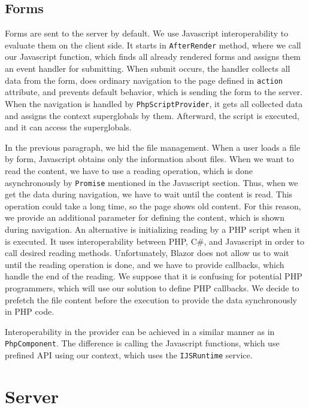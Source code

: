 \subsection{Forms}

Forms are sent to the server by default.
We use Javascript interoperability to evaluate them on the client side.
It starts in \texttt{AfterRender} method, where we call our Javascript function, which finds all already rendered forms and assigns them an event handler for submitting.
When submit occurs, the handler collects all data from the form, does ordinary navigation to the page defined in \texttt{action} attribute, and prevents default behavior, which is sending the form to the server.
When the navigation is handled by \texttt{PhpScriptProvider}, it gets all collected data and assigns the context superglobals by them.
Afterward, the script is executed, and it can access the superglobals.
\par
In the previous paragraph, we hid the file management.
When a user loads a file by form, Javascript obtains only the information about files. 
When we want to read the content, we have to use a reading operation, which is done asynchronously by \texttt{Promise} mentioned in the Javascript section.
Thus, when we get the data during navigation, we have to wait until the content is read.
This operation could take a long time, so the page shows old content.
For this reason, we provide an additional parameter for defining the content, which is shown during navigation.
An alternative is initializing reading by a PHP script when it is executed.
It uses interoperability between PHP, C\#, and Javascript in order to call desired reading methods.
Unfortunately, Blazor does not allow us to wait until the reading operation is done, and we have to provide callbacks, which handle the end of the reading.
We suppose that it is confusing for potential PHP programmers, which will use our solution to define PHP callbacks.
We decide to prefetch the file content before the execution to provide the data synchronously in PHP code.
\par
Interoperability in the provider can be achieved in a similar manner as in \texttt{PhpComponent}.
The difference is calling the Javascript functions, which use prefined API using our context, which uses the \texttt{IJSRuntime} service.

\section{Server}

